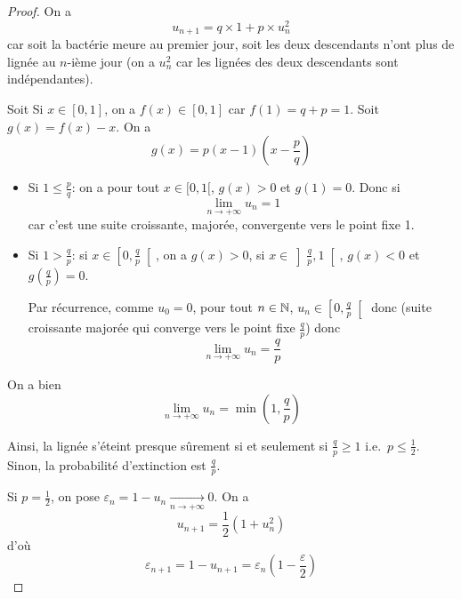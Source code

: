 \begin{proof}
    On a 
    \begin{equation}
        u_{n+1}=q\times 1+p\times u_{n}^{2}
    \end{equation}
    car soit la bactérie meure au premier jour, soit les deux descendants n'ont plus de lignée au $n$-ième jour (on a $u_{n}^{2}$ car les lignées des deux descendants sont indépendantes).

    Soit 
    Si $x\in[0,1]$, on a $f(x)\in[0,1]$ car $f(1)=q+p=1$. Soit $g(x)=f(x)-x$. On a 
    \begin{equation}
        g(x)=p\left(x-1\right)\left(x-\frac{p}{q}\right)
    \end{equation}
    \begin{itemize}
        \item Si $1\leqslant\frac{p}{q}$: on a pour tout $x\in[0,1[$, $g(x)>0$ et $g(1)=0$. Donc si 
        \begin{equation}
            \boxed{\lim\limits_{n\to+\infty}u_{n}=1}
        \end{equation}
        car c'est une suite croissante, majorée, convergente vers le point fixe 1.

        \item Si $1>\frac{q}{p}$: si $x\in\left[0,\frac{q}{p}\right[$, on a $g(x)>0$, si $x\in\left]\frac{q}{p},1\right[$, $g(x)<0$ et $g\left(\frac{q}{p}\right)=0$.
        
        Par récurrence, comme $u_{0}=0$, pour tout $n\in\mathbb{N}$, $u_{n}\in\left[0,\frac{q}{p}\right[$ donc (suite croissante majorée qui converge vers le point fixe $\frac{q}{p}$) donc 
        \begin{equation}
            \boxed{\lim\limits_{n\to+\infty}u_{n}=\frac{q}{p}}
        \end{equation}
    \end{itemize}

    On a bien 
    \begin{equation}
        \boxed{\lim\limits_{n\to+\infty}u_{n}=\min\left(1,\frac{q}{p}\right)}
    \end{equation}

    Ainsi, la lignée s'éteint presque sûrement si et seulement si $\frac{q}{p}\geqslant1$ i.e.~$p\leqslant\frac{1}{2}$. Sinon, la probabilité d'extinction est $\frac{q}{p}$.

    Si $p=\frac{1}{2}$, on pose $\varepsilon_{n}=1-u_{n}\xrightarrow[n\to+\infty]{}0$. On a 
    \begin{equation}
        u_{n+1}=\frac{1}{2}\left(1+u_{n}^{2}\right)
    \end{equation}
    d'où 
    \begin{equation}
        \varepsilon_{n+1}=1-u_{n+1}=\varepsilon_{n}\left(1-\frac{\varepsilon}{2}\right)
    \end{equation}


\end{proof}
